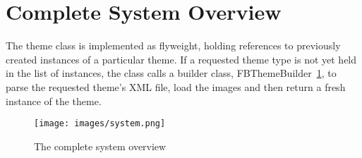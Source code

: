 \section{Complete System Overview}

The theme class is implemented as flyweight, holding references to previously 
created instances of a particular theme. If a requested theme type is not yet 
held in the list of instances, the class calls a builder class, 
FBThemeBuilder~\ref{fig:system}, to parse the requested theme's XML file, 
load the images and then return a fresh instance of the theme.

%
\begin{figure}[bt]
  \begin{center}
    \texttt{[image: images/system.png]}
  \end{center}
  \caption{The complete system overview}
  \label{fig:system}
\end{figure}
%